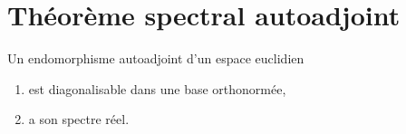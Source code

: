 \section{Théorème spectral autoadjoint}

\begin{theorem} \label{ThoRSBahHH}
    Un endomorphisme autoadjoint d'un espace euclidien
    \begin{enumerate}
        \item
            est diagonalisable dans une base orthonormée,
        \item
            a son spectre réel.
    \end{enumerate}
\end{theorem}

